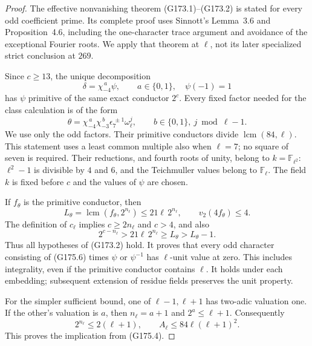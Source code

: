 \begin{proof}
The effective nonvanishing theorem (G173.1)--(G173.2) is stated for
every odd coefficient prime.  Its complete proof uses Sinnott's
Lemma~3.6 and Proposition~4.6, including the one-character trace
argument and avoidance of the exceptional Fourier roots.
We apply that theorem at $\ell$, not its later specialized strict
conclusion at $269$.

Since $c\geq13$, the unique decomposition
\[
          \delta=\chi_{-4}^{\,a}\psi,
       \qquad a\in\{0,1\},\quad\psi(-1)=1
 \tag{G175.5}
\]
has $\psi$ primitive of the same exact conductor $2^c$.
Every fixed factor needed for the class calculation is of the form
\[
        \theta=\chi_{-4}^{\,a}\chi_{-3}^{\,b}
                    \epsilon_7^{\,\pm1}\omega_\ell^j,
          \qquad b\in\{0,1\},\ j\bmod\ell-1.
 \tag{G175.6}
\]
We use only the odd factors.  Their primitive conductors divide
$\operatorname{lcm}(84,\ell)$.  This statement uses a least common
multiple also when $\ell=7$; no square of seven is required.
Their reductions, and fourth roots of unity, belong to
$k=\mathbb F_{\ell^2}$: $\ell^2-1$ is divisible by $4$ and $6$,
and the Teichmuller values belong to $\mathbb F_\ell$.
The field $k$ is fixed before $c$ and the values of $\psi$ are chosen.

If $f_\theta$ is the primitive conductor, then
\[
 L_\theta=\operatorname{lcm}(f_\theta,2^{n_\ell})
       \leq21\ell\,2^{n_\ell},\qquad
                         v_2(4f_\theta)\leq4.
 \tag{G175.7}
\]
The definition of $c_\ell$ implies
$c\geq2n_\ell$ and $c>4$, and also
\[
              2^{c-n_\ell}>21\ell\,2^{n_\ell}
                                     \geq L_\theta>L_\theta-1.
 \tag{G175.8}
\]
Thus all hypotheses of (G173.2) hold.  It proves that every odd
character consisting of (G175.6) times $\psi$ or $\psi^{-1}$ has
$\ell$-unit value at zero.  This includes integrality, even if the
primitive conductor contains $\ell$.  It holds under each embedding;
subsequent extension of residue fields preserves the unit property.

For the simpler sufficient bound, one of $\ell-1,\ell+1$ has
two-adic valuation one.  If the other's valuation is $a$, then
$n_\ell=a+1$ and $2^a\leq\ell+1$.  Consequently
\[
 2^{n_\ell}\leq2(\ell+1),\qquad
                   A_\ell\leq84\ell(\ell+1)^2.
 \tag{G175.9}
\]
This proves the implication from (G175.4).


\end{proof}
